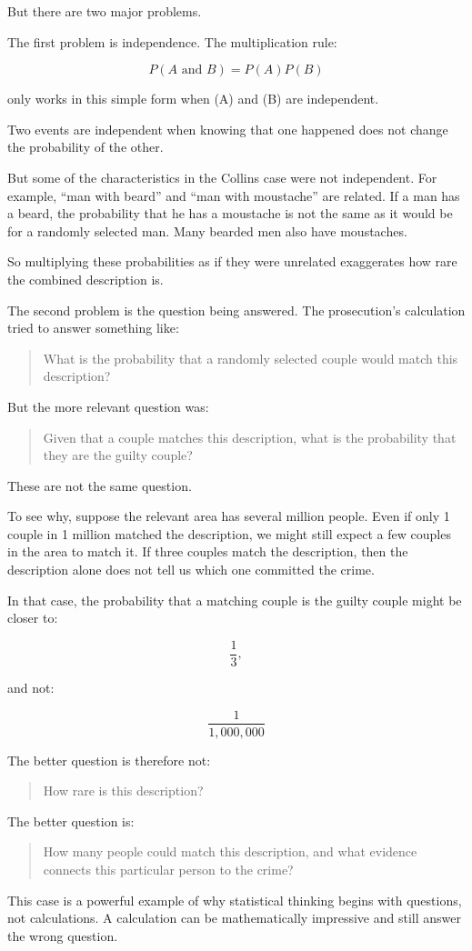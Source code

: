 \documentclass[
  letterpaper,
  DIV=11,
  numbers=noendperiod]{scrreprt}
\begin{document}
\begin{tcolorbox}
But there are two major problems.

The first problem is independence. The multiplication rule:

\[P(A \text{ and } B) = P(A)P(B)\]

only works in this simple form when (A) and (B) are independent.

Two events are independent when knowing that one happened does not
change the probability of the other.

But some of the characteristics in the Collins case were not
independent. For example, ``man with beard'' and ``man with moustache''
are related. If a man has a beard, the probability that he has a
moustache is not the same as it would be for a randomly selected man.
Many bearded men also have moustaches.

So multiplying these probabilities as if they were unrelated exaggerates
how rare the combined description is.

The second problem is the question being answered. The prosecution's
calculation tried to answer something like:

\begin{quote}
What is the probability that a randomly selected couple would match this
description?
\end{quote}

But the more relevant question was:

\begin{quote}
Given that a couple matches this description, what is the probability
that they are the guilty couple?
\end{quote}

These are not the same question.

To see why, suppose the relevant area has several million people. Even
if only 1 couple in 1 million matched the description, we might still
expect a few couples in the area to match it. If three couples match the
description, then the description alone does not tell us which one
committed the crime.

In that case, the probability that a matching couple is the guilty
couple might be closer to:

\[\frac{1}{3},\]

and not:

\[\frac{1}{1{,}000{,}000}\]

The better question is therefore not:

\begin{quote}
How rare is this description?
\end{quote}

The better question is:

\begin{quote}
How many people could match this description, and what evidence connects
this particular person to the crime?
\end{quote}

This case is a powerful example of why statistical thinking begins with
questions, not calculations. A calculation can be mathematically
impressive and still answer the wrong question.

\end{tcolorbox}
\end{document}
